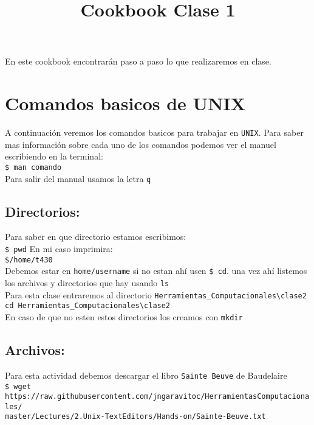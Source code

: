 \documentclass[12pt]{article}
\title{\begin{LARGE}
{Cookbook Clase 1}
\end{LARGE}}
\begin{document}
\maketitle

En este cookbook encontrar\'an paso a paso lo que realizaremos en clase.

\section{Comandos basicos de UNIX}

A continuaci\'on veremos los comandos basicos para trabajar en \verb+UNIX+.
Para saber mas informaci\'on sobre cada uno de los comandos podemos ver
el manuel escribiendo en la terminal:\\

\verb+$ man comando+ \\

Para salir del manual usamos la letra \verb+q+

\subsection{Directorios:}

Para saber en que directorio estamos escribimos: \\

\verb+$ pwd+ En mi caso imprimira:\\

\verb+$/home/t430+ \\

Debemos estar en \verb+home/username+ si no estan ah\'i usen \verb+$ cd+. una vez ah\'i listemos los 
archivos y directorios que hay usando \verb+ls+\\ 

Para esta clase entraremos al directorio \verb+Herramientas_Computacionales\clase2+ \\
\verb+cd Herramientas_Computacionales\clase2+\\
En caso de que no esten estos directorios los creamos con \verb+mkdir+



\subsection{Archivos:}

Para esta actividad debemos descargar el libro \verb+Sainte Beuve+ de Baudelaire\\

\verb+$ wget https://raw.githubusercontent.com/jngaravitoc/HerramientasComputacionales/+\\
\verb+master/Lectures/2.Unix-TextEditors/Hands-on/Sainte-Beuve.txt+
\end{document}
